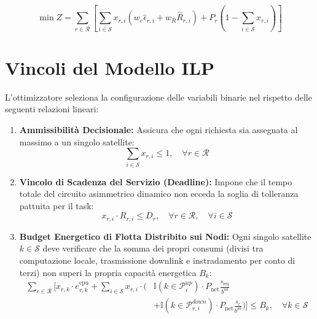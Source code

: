 \documentclass[12pt]{article}
\begin{document}
\begin{equation}
\min Z = \sum_{r \in \mathcal{R}} \left[ \sum_{i \in \mathcal{S}} x_{r,i} \left( w_e \widehat{\epsilon}_{r,i} + w_R \widehat{R}_{r,i} \right) + P_r \left( 1 - \sum_{i \in \mathcal{S}} x_{r,i} \right) \right]
\end{equation}

\section{Vincoli del Modello ILP}
L'ottimizzatore seleziona la configurazione delle variabili binarie nel rispetto delle seguenti relazioni lineari:

\begin{enumerate}
    \item \textbf{Ammissibilit\`a Decisionale:} Assicura che ogni richiesta sia assegnata al massimo a un singolo satellite:
    \begin{equation}
    \sum_{i \in \mathcal{S}} x_{r,i} \leq 1, \quad \forall r \in \mathcal{R}
    \end{equation}

    \item \textbf{Vincolo di Scadenza del Servizio (Deadline):} Impone che il tempo totale del circuito asimmetrico dinamico non ecceda la soglia di tolleranza pattuita per il task:
    \begin{equation}
    x_{r,i} \cdot R_{r,i} \leq D_r, \quad \forall r \in \mathcal{R}, \quad \forall i \in \mathcal{S}
    \end{equation}

\item \textbf{Budget Energetico di Flotta Distribito sui Nodi:} Ogni singolo satellite $k \in \mathcal{S}$ deve verificare che la somma dei propri consumi (divisi tra computazione locale, trasmissione downlink e instradamento per conto di terzi) non superi la propria capacit\`a energetica $B_k$:
\begin{equation}
\begin{aligned}
\sum_{r \in \mathcal{R}} \Bigg[ x_{r,k} \cdot e_{r,k}^{\text{cpu}} + \sum_{i \in \mathcal{S}} x_{r,i} \cdot \Bigg( & \mathbb{I}(k \in \mathcal{P}_i^{up}) \cdot P_{\text{net}} \frac{s_{\text{req}}}{b^{\text{isl}}} \\
& + \mathbb{I}(k \in \mathcal{P}_{r,i}^{down}) \cdot P_{\text{net}} \frac{s_r}{b^{\text{isl}}} \Bigg) \Bigg] \leq B_k, \quad \forall k \in \mathcal{S}
\end{aligned}
\end{equation}
\end{enumerate}
\end{document}
